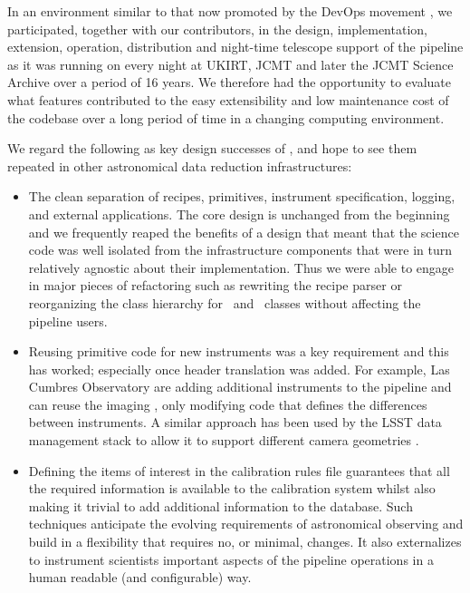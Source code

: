 \documentclass[final,authoryear,5p,times,twocolumn]{elsarticle}
\begin{document}
In an environment similar to that now promoted by the DevOps movement
\citep[see e.g.,][]{2014arXiv1407.6463E},
we participated, together with our contributors, in the design,
implementation, extension, operation, distribution and night-time
telescope support of the pipeline as it was running on every night at
UKIRT, JCMT and later the JCMT Science Archive over a period of 16
years. We therefore had the opportunity to evaluate what features
contributed to the easy extensibility and low maintenance cost of the
codebase over a long period of time in a changing computing environment.

We regard the following as key design successes of \oracdr, and hope
to see them repeated in other astronomical data reduction
infrastructures:

\begin{itemize}

\item The clean separation of recipes, primitives, instrument
  specification, logging, and external applications. The core design is
  unchanged from the beginning and we frequently reaped the benefits
  of a design that meant that the science code was well isolated from
  the infrastructure components that were in turn relatively agnostic
  about their implementation. Thus we were able to engage in major
  pieces of refactoring such as rewriting the recipe parser or
  reorganizing the class hierarchy for \Frame\ and \Group\ classes
  without affecting the pipeline users.

\item Reusing primitive code for new instruments was a key requirement
  and this has worked; especially once header translation was
  added. For example, Las Cumbres Observatory are adding additional
  instruments to the pipeline and can reuse the imaging \primitives,
  only modifying code that defines the differences between
  instruments. A similar approach has been used by the LSST data
  management stack to allow it to support different camera geometries
  \citep{2010SPIE.7740E..15A}.

\item Defining the items of interest in the calibration rules file
  guarantees that all the required information is available to the
  calibration system whilst also making it trivial to add additional
  information to the database. Such techniques anticipate the evolving
  requirements of astronomical observing and build in a flexibility
  that requires no, or minimal, changes. It also externalizes to
  instrument scientists important aspects of the pipeline operations
  in a human readable (and configurable) way.


\end{itemize}
\end{document}
